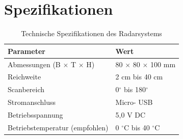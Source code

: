 %
%

\chapter{Spezifikationen}



\begin{table}[htbp]
	\centering
	\renewcommand{\arraystretch}{1.6}
	\begin{tabular}{|l|l|}
		\hline
		\textbf{Parameter} & \textbf{Wert} \\ \hline
		Abmessungen (B $\times$ T $\times$ H) & 80 $\times$ 80 $\times$ 100 mm \\ \hline
		Reichweite & 2 cm bis 40 cm \\ \hline
		Scanbereich & 0$^\circ$ bis 180$^\circ$\\ \hline
		Stromanschluss & Micro- USB \\ \hline
		Betriebsspannung & 5,0 V DC \\ \hline
		Betriebstemperatur (empfohlen) & 0 $^\circ$C bis 40 $^\circ$C \\ \hline
	\end{tabular}
	\caption{Technische Spezifikationen des Radarsystems}
	\label{tab:technische_spezifikationen}
\end{table}



